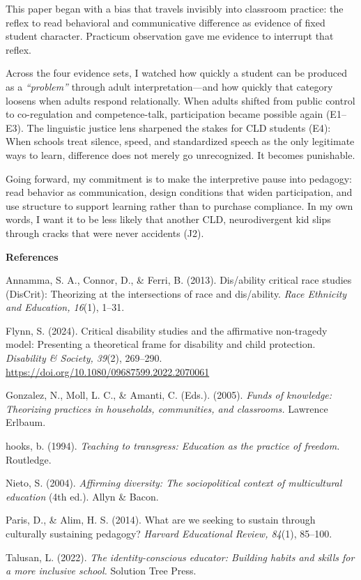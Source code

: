 \documentclass[12pt]{article}
\newcommand{\apaheading}[1]{\begin{center}\textbf{#1}\end{center}}
\newcommand{\reference}[1]{\noindent\hangindent=0.5in\hangafter=1 #1\par}
\newcommand{\EvidenceSet}[1]{\textsc{E#1}}
\newcommand{\JournalArtifact}[1]{\textsc{J#1}}
\begin{document}
This paper began with a bias that travels invisibly into classroom practice: the reflex to read behavioral and communicative difference as evidence of fixed student character. Practicum observation gave me evidence to interrupt that reflex.

Across the four evidence sets, I watched how quickly a student can be produced as a \textit{``problem''} through adult interpretation---and how quickly that category loosens when adults respond relationally. When adults shifted from public control to co-regulation and competence-talk, participation became possible again (\EvidenceSet{1}--\EvidenceSet{3}). The linguistic justice lens sharpened the stakes for CLD students (\EvidenceSet{4}): When schools treat silence, speed, and standardized speech as the only legitimate ways to learn, difference does not merely go unrecognized. It becomes punishable.

Going forward, my commitment is to make the interpretive pause into pedagogy: read behavior as communication, design conditions that widen participation, and use structure to support learning rather than to purchase compliance. In my own words, I want it to be less likely that another CLD, neurodivergent kid slips through cracks that were never accidents (\JournalArtifact{2}).

\newpage
\apaheading{References}

\reference{Annamma, S. A., Connor, D., \& Ferri, B. (2013). Dis/ability critical race studies (DisCrit): Theorizing at the intersections of race and dis/ability. \textit{Race Ethnicity and Education, 16}(1), 1--31.}

\reference{Flynn, S. (2024). Critical disability studies and the affirmative non-tragedy model: Presenting a theoretical frame for disability and child protection. \textit{Disability \& Society, 39}(2), 269--290. \url{https://doi.org/10.1080/09687599.2022.2070061}}

\reference{Gonzalez, N., Moll, L. C., \& Amanti, C. (Eds.). (2005). \textit{Funds of knowledge: Theorizing practices in households, communities, and classrooms.} Lawrence Erlbaum.}

\reference{hooks, b. (1994). \textit{Teaching to transgress: Education as the practice of freedom.} Routledge.}

\reference{Nieto, S. (2004). \textit{Affirming diversity: The sociopolitical context of multicultural education} (4th ed.). Allyn \& Bacon.}

\reference{Paris, D., \& Alim, H. S. (2014). What are we seeking to sustain through culturally sustaining pedagogy? \textit{Harvard Educational Review, 84}(1), 85--100.}

\reference{Talusan, L. (2022). \textit{The identity-conscious educator: Building habits and skills for a more inclusive school.} Solution Tree Press.}
\end{document}
